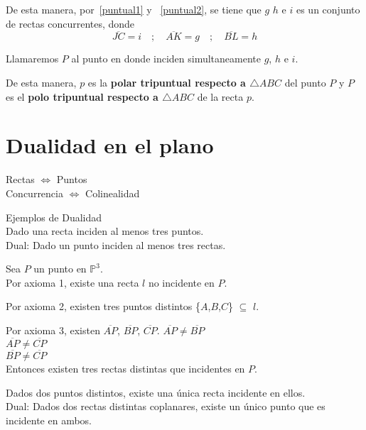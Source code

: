 \documentclass[12pt]{book}
\theoremstyle{definition}
\begin{document}
De esta manera, por~\ref{puntual1} y ~\ref{puntual2}, se tiene que $g$ $h$ e $i$ es un conjunto de rectas concurrentes, donde
$$\overline{JC}= i \quad; \quad \overline{AK} = g \quad ; \quad \overline{BL} = h$$

Llamaremos $P$ al punto en donde inciden simultaneamente $g$, $h$ e $i$.

De esta manera, $p$ es la \textbf{polar tripuntual respecto a $\triangle ABC$} del punto $P$ y $P$ es el \textbf{polo tripuntual respecto a $\triangle ABC$} de la recta $p$.

\chapter{Dualidad en el plano}

Rectas $\Leftrightarrow$ Puntos\\
Concurrencia $\Leftrightarrow$ Colinealidad

  Ejemplos de Dualidad\\
  Dado una recta inciden al menos tres puntos.\\
  Dual: Dado un punto inciden al menos tres rectas.
  
    Sea $P$ un punto en $\mathbb{P}^3$.\\
    Por axioma 1, existe una recta $l$ no incidente en $P$.

    Por axioma 2, existen tres puntos distintos \{$A$,$B$,$C$\} $\subseteq$ $l$.

    Por axioma 3, existen $\overline{AP}$, $\overline{BP}$, $\overline{CP}$.
    $\overline{AP} \neq \overline{BP}$\\
    $\overline{AP} \neq \overline{CP}$\\
    $\overline{BP} \neq \overline{CP}$\\

    Entonces existen tres rectas distintas que incidentes en $P$.

  Dados dos puntos distintos, existe una única recta incidente en ellos.\\
  Dual: Dados dos rectas distintas coplanares, existe un único punto que es
  incidente en ambos.\\
\end{document}
